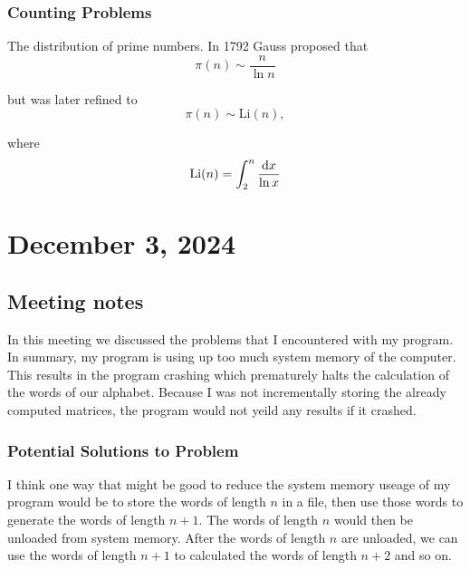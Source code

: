 \documentclass{amsart}
\begin{document}
\subsubsection{Counting Problems}

\begin{example*}
	The distribution of prime numbers. In 1792 Gauss proposed that
	\begin{equation*}
		\pi(n) \sim \frac{n}{\ln n}
	\end{equation*}
	
	but was later refined to 
	\begin{equation*}
		\pi(n) \sim \text{Li}(n),
	\end{equation*}
	
	where
	\begin{equation*}
		\text{Li}(n) = \int_{2}^{n} \frac{\mathop{}\!\mathrm{d} x}{\ln x}
	\end{equation*}\cite{wolfram_prime_num_theorem}
\end{example*}


\section{December 3, 2024}
\subsection{Meeting notes}

\begin{summary}
	In this meeting we discussed the problems that I encountered with my program. In summary, my program is using up too much system memory of the computer. This results in the program crashing which prematurely halts the calculation of the words of our alphabet. Because I was not incrementally storing the already computed matrices, the program would not yeild any results if it crashed. 
\end{summary}



\subsubsection*{Potential Solutions to Problem}
I think one way that might be good to reduce the system memory useage of my program would be to store the words of length $n$ in a file, then use those words to generate the words of length $n + 1$. The words of length $n$ would then be unloaded from system memory. After the words of length $n$ are unloaded, we can use the words of length $n + 1$ to calculated the words of length $n + 2$ and so on. 
\end{document}
